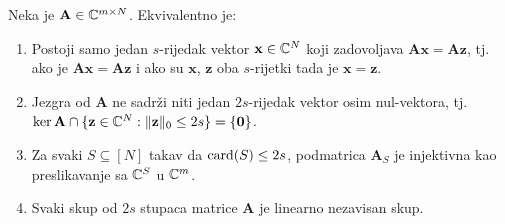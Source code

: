\documentclass[a4paper,twoside,12pt]{memoir} %
\newcommand{\vect}[1]{\mathbf{#1}}
\renewcommand{\vec}{\vect}
\newcommand{\card}{\text{\normalfont{card}}}
\newcommand{\norm}[1]{\|{#1}\|}
\begin{document}
\begin{thm} \label{rekonstrukcija_tm1}
    Neka je $\vec A \in \C^{m \times N}$. Ekvivalentno je:
    \begin{enumerate}[label=(\alph*)]
        \item Postoji samo jedan $s$-rijedak vektor $\vec x \in \C^N$ koji zadovoljava $\vec{Ax} = \vec{Az}$, tj. ako je $\vec{Ax}=\vec{Az}$ i ako su $\vec x$, $\vec z$ oba $s$-rijetki tada je $\vec x = \vec z$.
        \item Jezgra od $\vec A$ ne sadr\v{z}i niti jedan $2s$-rijedak vektor osim nul-vektora, tj. $\ker \vec A \cap \{\vec z \in \C^N: \norm{\vec z}_0 \leq 2s\} = \{\vec 0\}$.
        \item Za svaki $S \subseteq [N]$ takav da $\card(S) \leq 2s$, podmatrica $\vec A_S$ je injektivna kao preslikavanje sa $\mathbb{C}^S$ u $\mathbb{C}^m$.
        \item Svaki skup od $2s$ stupaca matrice $\vec A$ je linearno nezavisan skup.
    \end{enumerate}
\end{thm}
\end{document}
